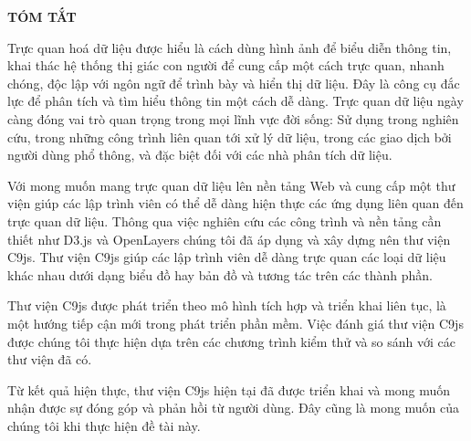 \begin{titlepage}
\centering
	{\scshape\LARGE \textbf{TÓM TẮT} \par}
	\vspace{1cm}
	
\begin{flushleft}
Trực quan hoá dữ liệu được hiểu là cách dùng hình ảnh để biểu diễn thông tin, khai thác hệ thống thị giác con người để cung cấp một cách trực quan, nhanh chóng, độc lập với ngôn ngữ để trình bày và hiển thị dữ liệu. Đây là công cụ đắc lực để phân tích và tìm hiểu thông tin một cách dễ dàng. Trực quan dữ liệu ngày càng đóng vai trò quan trọng trong mọi lĩnh vực đời sống: Sử dụng trong nghiên cứu, trong những công trình liên quan tới xử lý dữ liệu, trong các giao dịch bởi người dùng phổ thông, và đặc biệt
đối với các nhà phân tích dữ liệu.\par

Với mong muốn mang trực quan dữ liệu lên nền tảng Web và cung cấp một thư viện giúp các lập trình viên có thể dễ dàng hiện thực các ứng dụng liên quan đến trực quan dữ liệu. Thông qua việc nghiên cứu các công trình và nền tảng cần thiết như D3.js và OpenLayers chúng tôi đã áp dụng và xây dựng nên thư viện C9js. Thư viện C9js giúp các lập trình viên dễ dàng trực quan các loại dữ liệu khác nhau dưới dạng biểu đồ hay bản đồ và tương tác trên các thành phần.\par

Thư viện C9js được phát triển theo mô hình tích hợp và triển khai liên tục, là một hướng tiếp cận mới trong phát triển phần mềm. Việc đánh giá thư viện C9js được chúng tôi thực hiện dựa trên các chương trình kiểm thử và so sánh với các thư viện đã có.\par

Từ kết quả hiện thực, thư viện C9js hiện tại đã được triển khai và mong muốn nhận được sự đóng góp và phản hồi từ người dùng. Đây cũng là mong muốn của chúng tôi khi thực hiện đề tài này.\par
\end{flushleft}


\vfill %
\end{titlepage}